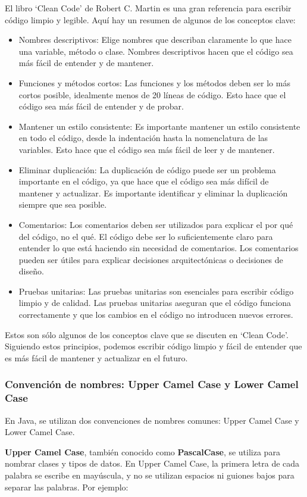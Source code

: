 \documentclass{article}
\begin{document}
El libro \enquote*{Clean Code} de Robert C. Martin es una gran referencia para escribir código limpio y legible. Aquí hay un resumen de algunos de los conceptos clave:
\begin{itemize}
    \item Nombres descriptivos: Elige nombres que describan claramente lo que hace una variable, método o clase. Nombres descriptivos hacen que el código sea más fácil de entender y de mantener.
    \item Funciones y métodos cortos: Las funciones y los métodos deben ser lo más cortos posible, idealmente menos de 20 líneas de código. Esto hace que el código sea más fácil de entender y de probar.
    \item Mantener un estilo consistente: Es importante mantener un estilo consistente en todo el código, desde la indentación hasta la nomenclatura de las variables. Esto hace que el código sea más fácil de leer y de mantener.
    \item Eliminar duplicación: La duplicación de código puede ser un problema importante en el código, ya que hace que el código sea más difícil de mantener y actualizar. Es importante identificar y eliminar la duplicación siempre que sea posible.
    \item Comentarios: Los comentarios deben ser utilizados para explicar el por qué del código, no el qué. El código debe ser lo suficientemente claro para entender lo que está haciendo sin necesidad de comentarios. Los comentarios pueden ser útiles para explicar decisiones arquitectónicas o decisiones de diseño.
    \item Pruebas unitarias: Las pruebas unitarias son esenciales para escribir código limpio y de calidad. Las pruebas unitarias aseguran que el código funciona correctamente y que los cambios en el código no introducen nuevos errores.
    \end{itemize}
Estos son sólo algunos de los conceptos clave que se discuten en \enquote*{Clean Code}. Siguiendo estos principios, podemos escribir código limpio y fácil de entender que es más fácil de mantener y actualizar en el futuro.    

\subsubsection*{Convención de nombres: Upper Camel Case y Lower Camel Case}
En Java, se utilizan dos convenciones de nombres comunes: Upper Camel Case y Lower Camel Case.

\textbf{Upper Camel Case}, también conocido como \textbf{PascalCase}, se utiliza para nombrar clases y tipos de datos. En Upper Camel Case, la primera letra de cada palabra se escribe en mayúscula, y no se utilizan espacios ni guiones bajos para separar las palabras. Por ejemplo:
\end{document}
